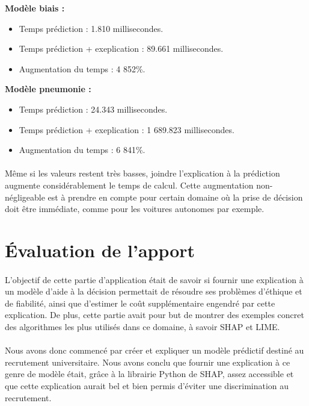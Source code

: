 \textbf{Modèle biais :}
\begin{itemize}
    \item Temps prédiction : 1.810 millisecondes.
    \item Temps prédiction + exeplication : 89.661 millisecondes.
    \item Augmentation du temps : 4 852\%.
\end{itemize}

\textbf{Modèle pneumonie :}
\begin{itemize}
    \item Temps prédiction : 24.343 millisecondes.
    \item Temps prédiction + exeplication : 1 689.823 millisecondes.
    \item Augmentation du temps : 6 841\%.
\end{itemize}
\paragraph{} Même si les valeurs restent très basses, joindre l'explication à la prédiction augmente considérablement le temps de calcul. Cette augmentation non-négligeable est à prendre en compte pour certain domaine où la prise de décision doit être immédiate, comme pour les voitures autonomes par exemple.

\section{Évaluation de l'apport}
\paragraph{}L'objectif de cette partie d'application était de savoir si fournir une explication à un modèle d'aide à la décision permettait de résoudre ses problèmes d'éthique et de fiabilité, ainsi que d'estimer le coût supplémentaire engendré par cette explication. De plus, cette partie avait pour but de montrer des exemples concret des algorithmes les plus utilisés dans ce domaine, à savoir SHAP et LIME.

\paragraph{}Nous avons donc commencé par créer et expliquer un modèle prédictif destiné au recrutement universitaire. Nous avons conclu que fournir une explication à ce genre de modèle était, grâce à la librairie Python de SHAP, assez accessible et que cette explication aurait bel et bien permis d'éviter une discrimination au recrutement.

